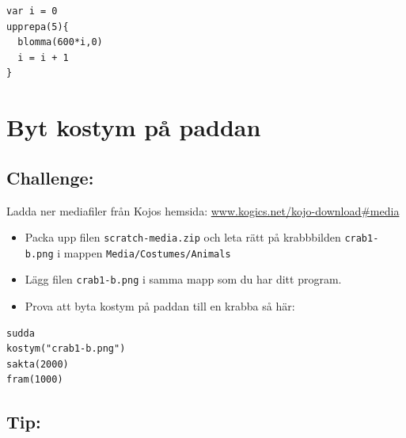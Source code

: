 \begin{lstlisting}[basicstyle={\ttfamily\fontsize{18}{22}\selectfont},numbers=none]
var i = 0          
upprepa(5){
  blomma(600*i,0)
  i = i + 1        
}
\end{lstlisting}
        
\chapter{Byt kostym på paddan}\section*{\color{BrickRed}Challenge:}
Ladda ner mediafiler från Kojos hemsida:
\href{http://www.kogics.net/kojo-download#media}{www.kogics.net/kojo-download\#media}


\begin{itemize}

\item {Packa upp filen \lstinline{scratch-media.zip} och leta rätt på krabbbilden \lstinline{crab1-b.png} i mappen \lstinline{Media/Costumes/Animals}}
\item {Lägg filen \lstinline{crab1-b.png} i samma mapp som du har ditt program.}
\item {Prova att byta kostym på paddan till en krabba så här:}

\end{itemize}



  

\begin{lstlisting}[basicstyle={\ttfamily\fontsize{20}{24}\selectfont},numbers=none]
sudda
kostym("crab1-b.png")  
sakta(2000)
fram(1000)
\end{lstlisting}
        
\section*{\color{OliveGreen}Tip:}


